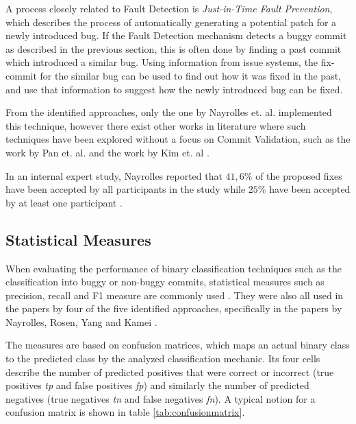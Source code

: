 A process closely related to Fault Detection is \textit{Just-in-Time Fault Prevention}, which describes the process of automatically generating a potential patch for a newly introduced bug. If the Fault Detection mechanism detects a buggy commit as described in the previous section, this is often done by finding a past commit which introduced a similar bug. Using information from issue systems, the fix-commit for the similar bug can be used to find out how it was fixed in the past, and use that information to suggest how the newly introduced bug can be fixed. \cite{Nayrolles2018}

From the identified approaches, only the one by Nayrolles et. al. implemented this technique, however there exist other works in literature where such techniques have been explored without a focus on Commit Validation, such as the work by Pan et. al. and the work by Kim et. al \cite{Nayrolles2018, Kim2013, Pan2009}.

In an internal expert study, Nayrolles reported that $41,6\%$ of the proposed fixes have been accepted by all participants in the study while $25\%$ have been accepted by at least one participant \cite{Nayrolles2018}.

\subsection{Statistical Measures}
\label{sec:statisticalmeasures}


When evaluating the performance of binary classification techniques such as the classification into buggy or non-buggy commits, statistical measures such as precision, recall and F1 measure are commonly used \cite{Powers2007}. They were also all used in the papers by four of the five identified approaches, specifically in the papers by Nayrolles, Rosen, Yang and Kamei \cite{Nayrolles2018, Rosen2015, Yang2015, Kamei2013}.


The measures are based on confusion matrices, which maps an actual binary class to the predicted class by the analyzed classification mechanic. Its four cells describe the number of predicted positives that were correct or incorrect (true positives \textit{tp} and false positives \textit{fp}) and similarly the number of predicted negatives (true negatives \textit{tn} and false negatives \textit{fn}). A typical notion for a confusion matrix is shown in table \ref{tab:confusionmatrix}. \cite{Powers2007, Fawcett2006}

